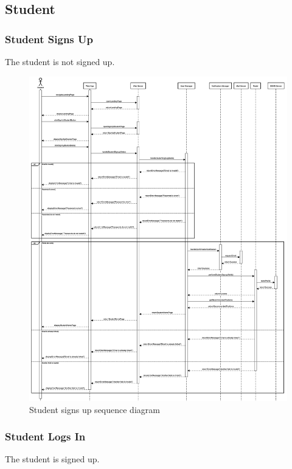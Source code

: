 \clearpage
\subsection{Student}
\subsubsection{Student Signs Up}
The student is not signed up.

\begin{figure}[h!]
    \centering
    \includegraphics[width=14cm]{images/sequence-diagrams/student-signs-up.png}
    \caption{Student signs up sequence diagram}
\end{figure}

\clearpage
\subsubsection{Student Logs In}
The student is signed up.

